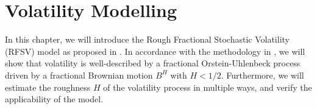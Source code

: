 \chapter{Volatility Modelling}
In this chapter, we will introduce the Rough Fractional Stochastic Volatility (RFSV) model as proposed in \cite{volisrough}. In accordance with the methodology in \cite{volisrough}, we will show that volatility is well-described by a fractional Orstein-Uhlenbeck process driven by a fractional Brownian motion $B^H$ with $H<1/2$. Furthermore, we will estimate the roughness $H$ of the volatility process in multiple ways, and verify the applicability of the model.


